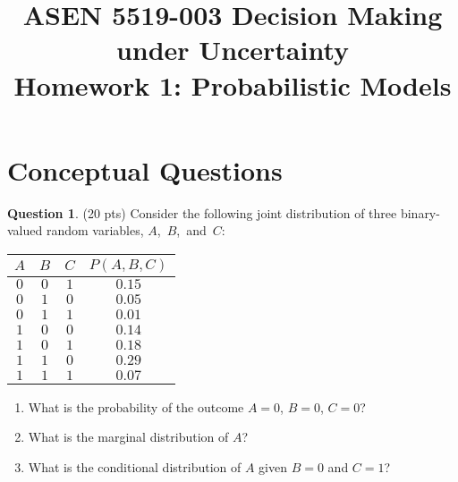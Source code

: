 \documentclass{article}
\title{ASEN 5519-003 Decision Making under Uncertainty\\
       Homework 1: Probabilistic Models}
\theoremstyle{definition}
\newtheorem{question}[thm]{Question}
\begin{document}
\maketitle

\section{Conceptual Questions}

\begin{question} (20 pts)
    Consider the following joint distribution of three binary-valued random variables, \mbox{$A$, $B$, and $C$}:

    \begin{minipage}{0.23\linewidth}
        \vspace{1em}
    {\tiny
    \begin{tabular}{cccc}
        \toprule
            $A$ & $B$ & $C$ & $P(A,B,C)$ \\
        \midrule
            $0$ & $0$ & $1$ & $0.15$ \\
            $0$ & $1$ & $0$ & $0.05$ \\
            $0$ & $1$ & $1$ & $0.01$ \\
            $1$ & $0$ & $0$ & $0.14$ \\
            $1$ & $0$ & $1$ & $0.18$ \\
            $1$ & $1$ & $0$ & $0.29$ \\
            $1$ & $1$ & $1$ & $0.07$ \\
        \bottomrule
    \end{tabular}
    }
    \end{minipage}
    \begin{minipage}{0.75\linewidth}
        \begin{enumerate}[label=\alph*)]
            \item What is the probability of the outcome $A=0$, $B=0$, $C=0$?
            \item What is the marginal distribution of $A$?
            \item What is the conditional distribution of $A$ given $B=0$ and $C=1$?
        \end{enumerate}
    \end{minipage}
\end{question}
\end{document}
